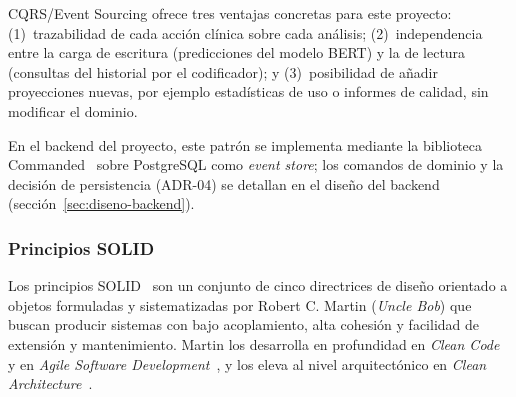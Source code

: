 CQRS/Event Sourcing ofrece tres ventajas concretas para este proyecto: (1)~trazabilidad de cada acción clínica sobre cada análisis; (2)~independencia entre la carga de escritura (predicciones del modelo BERT) y la de lectura (consultas del historial por el codificador); y (3)~posibilidad de añadir proyecciones nuevas, por ejemplo estadísticas de uso o informes de calidad, sin modificar el dominio.

En el backend del proyecto, este patrón se implementa mediante la biblioteca Commanded~\cite{commanded2024} sobre PostgreSQL como \emph{event store}; los comandos de dominio y la decisión de persistencia (ADR-04) se detallan en el diseño del backend (sección~\ref{sec:diseno-backend}).

\subsubsection{Principios SOLID}

Los principios SOLID~\cite{MartinCleanCode08,MartinPPP02} son un conjunto de cinco directrices de diseño orientado a objetos formuladas y sistematizadas por Robert C. Martin (\emph{Uncle Bob}) que buscan producir sistemas con bajo acoplamiento, alta cohesión y facilidad de extensión y mantenimiento. Martin los desarrolla en profundidad en \emph{Clean Code}~\cite{MartinCleanCode08} y en \emph{Agile Software Development}~\cite{MartinPPP02}, y los eleva al nivel arquitectónico en \emph{Clean Architecture}~\cite{MartinCleanArch17}.

